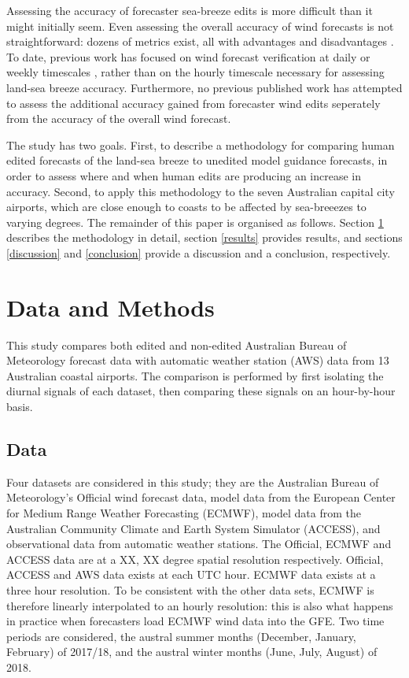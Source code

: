 \documentclass[alpha-refs]{wiley-article}
\begin{document}
Assessing the accuracy of forecaster sea-breeze edits is more difficult than it might initially seem. Even assessing the overall accuracy of wind forecasts is not straightforward:  dozens of metrics exist, all with advantages and disadvantages \citep{mason08}. To date, previous work has focused on wind forecast verification at daily or weekly timescales \citep[e.g.][]{pinson12, lynch14}, rather than on the hourly timescale necessary for assessing land-sea breeze accuracy. Furthermore, no previous published work has attempted to assess the additional accuracy gained from forecaster wind edits seperately from the accuracy of the overall wind forecast.   

The study has two goals. First, to describe a methodology for comparing human edited forecasts of the land-sea breeze to unedited model guidance forecasts, in order to assess where and when human edits are producing an increase in accuracy. Second, to apply this methodology to the seven Australian capital city airports, which are close enough to coasts to be affected by sea-breeezes to varying degrees. The remainder of this paper is organised as follows. Section \ref{methods} describes the methodology in detail, section \ref{results} provides results, and sections \ref{discussion} and \ref{conclusion} provide a discussion and a conclusion, respectively.     

\section{Data and Methods} \label{methods}
This study compares both edited and non-edited Australian Bureau of Meteorology forecast data with automatic weather station (AWS) data from 13 Australian coastal airports. The comparison is performed by first isolating the diurnal signals of each dataset, then comparing these signals on an hour-by-hour basis. 

\subsection{Data} 
Four datasets are considered in this study; they are the Australian Bureau of Meteorology's Official wind forecast data, model data from the European Center for Medium Range Weather Forecasting (ECMWF), model data from the Australian Community Climate and Earth System Simulator (ACCESS), and observational data from automatic weather stations. The Official, ECMWF and ACCESS data are at a XX, XX degree spatial resolution respectively. Official, ACCESS and AWS data exists at each UTC hour. ECMWF data exists at a three hour resolution. To be consistent with the other data sets, ECMWF is therefore linearly interpolated to an hourly resolution: this is also what happens in practice when forecasters load ECMWF wind data into the GFE. Two time periods are considered, the austral summer months (December, January, February) of 2017/18, and the austral winter months (June, July, August) of 2018. 
\end{document}
